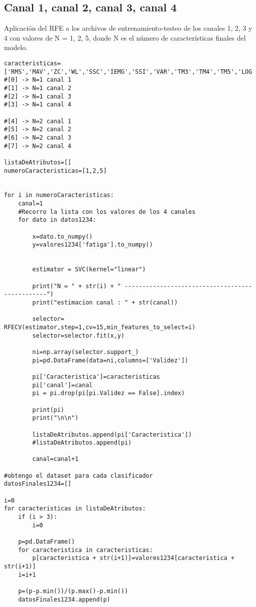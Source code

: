     \subsection{Canal 1, canal 2, canal 3, canal 4}
Aplicación del RFE a los archivos de entrenamiento-testeo de los canales 1, 2, 3 y 4 con valores de N = 1, 2, 5, donde N es el número de características finales del modelo.
\begin{lstlisting}
caracteristicas=['RMS','MAV','ZC','WL','SSC','IEMG','SSI','VAR','TM3','TM4','TM5','LOG','ACC','MNF','MDF']
#[0] -> N=1 canal 1
#[1] -> N=1 canal 2
#[2] -> N=1 canal 3
#[3] -> N=1 canal 4

#[4] -> N=2 canal 1
#[5] -> N=2 canal 2
#[6] -> N=2 canal 3
#[7] -> N=2 canal 4

listaDeAtributos=[]
numeroCaracteristicas=[1,2,5]


for i in numeroCaracteristicas:
    canal=1
    #Recorro la lista con los valores de los 4 canales
    for dato in datos1234:

        x=dato.to_numpy()
        y=valores1234['fatiga'].to_numpy()

        
        estimator = SVC(kernel="linear")
    
        print("N = " + str(i) + " ------------------------------------------------")
        print("estimacion canal : " + str(canal))

        selector= RFECV(estimator,step=1,cv=15,min_features_to_select=i)
        selector=selector.fit(x,y)

        ni=np.array(selector.support_)
        pi=pd.DataFrame(data=ni,columns=['Validez'])

        pi['Caracteristica']=caracteristicas
        pi['canal']=canal
        pi = pi.drop(pi[pi.Validez == False].index)

        print(pi)
        print("\n\n")

        listaDeAtributos.append(pi['Caracteristica'])
        #listaDeAtributos.append(pi)

        canal=canal+1

#obtengo el dataset para cada clasificador
datosFinales1234=[]

i=0
for caracteristicas in listaDeAtributos:
    if (i > 3):
        i=0
        
    p=pd.DataFrame()
    for caracteristica in caracteristicas:
        p[caracteristica + str(i+1)]=valores1234[caracteristica + str(i+1)]
    i=i+1

    p=(p-p.min())/(p.max()-p.min())
    datosFinales1234.append(p)
\end{lstlisting}



